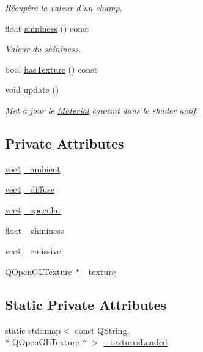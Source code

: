 \begin{DoxyCompactItemize}
\begin{DoxyCompactList}\small\item\em Récupère la valeur d'un champ. \end{DoxyCompactList}\item 
float \hyperlink{class_material_a9a938aa96f0d5a5dc4d17d43cfd4b42b}{shininess} () const 
\begin{DoxyCompactList}\small\item\em Valeur du shininess. \end{DoxyCompactList}\item 
bool \hyperlink{class_material_a57ea70765a4884a2500ebb51359cc79d}{has\+Texture} () const 
\item 
void \hyperlink{class_material_a3f43fe7bcfa721fd8156adb151adf45c}{update} ()
\begin{DoxyCompactList}\small\item\em Met à jour le \hyperlink{class_material}{Material} courant dans le shader actif. \end{DoxyCompactList}\end{DoxyCompactItemize}
\subsection*{Private Attributes}
\begin{DoxyCompactItemize}
\item 
\hyperlink{structvec4}{vec4} \hyperlink{class_material_a8631fe4ccaea32b5f83d618490ed1a94}{\+\_\+ambient}
\item 
\hyperlink{structvec4}{vec4} \hyperlink{class_material_ac6d5a21fb938c37d981ff904baa139ce}{\+\_\+diffuse}
\item 
\hyperlink{structvec4}{vec4} \hyperlink{class_material_aa86eef19901a701e22ef3ddd7b9c8ec2}{\+\_\+specular}
\item 
float \hyperlink{class_material_ae3f666b9de93b770232ebb5b1b3ee47e}{\+\_\+shininess}
\item 
\hyperlink{structvec4}{vec4} \hyperlink{class_material_a48f498add75d2e7b0022b3f34271e22b}{\+\_\+emissive}
\item 
Q\+Open\+G\+L\+Texture $\ast$ \hyperlink{class_material_a4e94f174d1785f0912574fee4ae2fbc2}{\+\_\+texture}
\end{DoxyCompactItemize}
\subsection*{Static Private Attributes}
\begin{DoxyCompactItemize}
\item 
static std\+::map$<$ const Q\+String, \\*
Q\+Open\+G\+L\+Texture $\ast$ $>$ \hyperlink{class_material_a9ccbb6b22b224284050b4d6c172829fc}{\+\_\+textures\+Loaded}
\end{DoxyCompactItemize}


